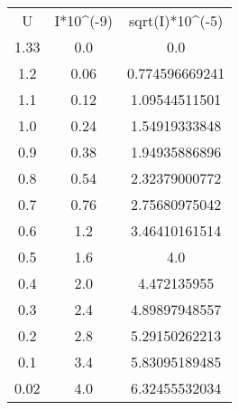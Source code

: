 \begin{table}
\begin{tabular}{ccc}
U & I*10^(-9) & sqrt(I)*10^(-5) \\
1.33 & 0.0 & 0.0 \\
1.2 & 0.06 & 0.774596669241 \\
1.1 & 0.12 & 1.09544511501 \\
1.0 & 0.24 & 1.54919333848 \\
0.9 & 0.38 & 1.94935886896 \\
0.8 & 0.54 & 2.32379000772 \\
0.7 & 0.76 & 2.75680975042 \\
0.6 & 1.2 & 3.46410161514 \\
0.5 & 1.6 & 4.0 \\
0.4 & 2.0 & 4.472135955 \\
0.3 & 2.4 & 4.89897948557 \\
0.2 & 2.8 & 5.29150262213 \\
0.1 & 3.4 & 5.83095189485 \\
0.02 & 4.0 & 6.32455532034 \\
\end{tabular}
\end{table}
